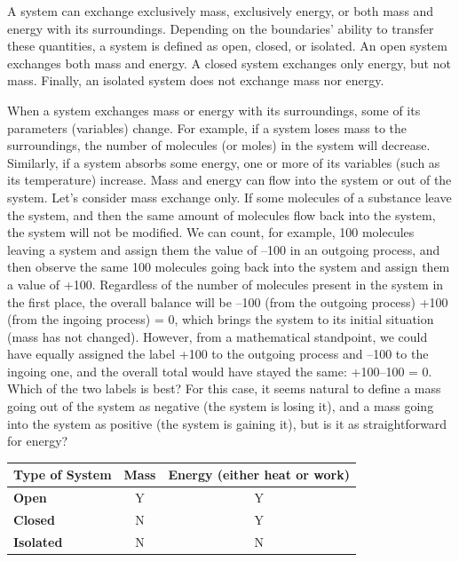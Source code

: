 \documentclass[
  9pt,
]{extbook}
\theoremstyle{definition}
\theoremstyle{definition}
\theoremstyle{definition}
\theoremstyle{remark}
\begin{document}
A system can exchange exclusively mass, exclusively energy, or both mass and energy with its surroundings. Depending on the boundaries' ability to transfer these quantities, a system is defined as open, closed, or isolated. An open system exchanges both mass and energy. A closed system exchanges only energy, but not mass. Finally, an isolated system does not exchange mass nor energy.

When a system exchanges mass or energy with its surroundings, some of its parameters (variables) change. For example, if a system loses mass to the surroundings, the number of molecules (or moles) in the system will decrease. Similarly, if a system absorbs some energy, one or more of its variables (such as its temperature) increase. Mass and energy can flow into the system or out of the system. Let's consider mass exchange only. If some molecules of a substance leave the system, and then the same amount of molecules flow back into the system, the system will not be modified. We can count, for example, 100 molecules leaving a system and assign them the value of --100 in an outgoing process, and then observe the same 100 molecules going back into the system and assign them a value of +100. Regardless of the number of molecules present in the system in the first place, the overall balance will be --100 (from the outgoing process) +100 (from the ingoing process) = 0, which brings the system to its initial situation (mass has not changed). However, from a mathematical standpoint, we could have equally assigned the label +100 to the outgoing process and --100 to the ingoing one, and the overall total would have stayed the same: +100--100 = 0. Which of the two labels is best? For this case, it seems natural to define a mass going out of the system as negative (the system is losing it), and a mass going into the system as positive (the system is gaining it), but is it as straightforward for energy?

\begin{longtable}[]{@{}lcc@{}}
\toprule
\textbf{Type of System} & \textbf{Mass} & \textbf{Energy} (either heat or work) \\
\midrule
\endhead
\textbf{Open} & Y & Y \\
\textbf{Closed} & N & Y \\
\textbf{Isolated} & N & N \\
\bottomrule
\end{longtable}
\end{document}
